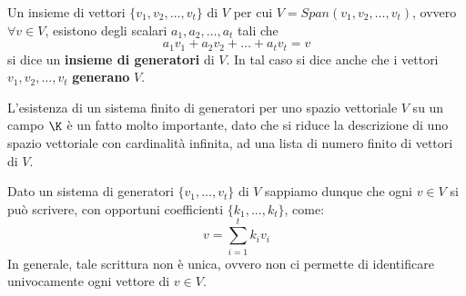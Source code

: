 \begin{definition}
	Un insieme di vettori $\{v_1, v_2, \dots, v_t\}$ di $V$ per cui
	$V = Span(v_1, v_2, \dots, v_t)$, ovvero $\forall v \in V$, esistono degli
	scalari $a_1, a_2, \dots, a_t$ tali che
	\[ a_1 v_1 + a_2 v_2 + \dots + a_t v_t = v \]
	si dice un \textbf{insieme di generatori} di $V$. In tal caso si dice anche
	che i vettori $v_1, v_2, \dots, v_t$ \textbf{generano} $V$.
\end{definition}

L'esistenza di un sistema finito di generatori per uno spazio vettoriale $V$ su
un campo $\K$ è un fatto molto importante, dato che si riduce la descrizione di
uno spazio vettoriale con cardinalità infinita, ad una lista di numero finito di
vettori di $V$.

Dato un sistema di generatori $\{v_1, ..., v_t\}$ di $V$ sappiamo dunque che
ogni $v \in V$ si può scrivere, con opportuni coefficienti $\{k_1, ..., k_t\}$,
come:
\[ v = \sum_{i=1}^t k_i v_i \]
In generale, tale scrittura non è unica, ovvero non ci permette di identificare
univocamente ogni vettore di $v \in V$.

